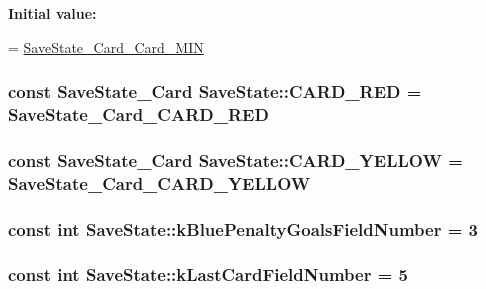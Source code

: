 {\bfseries Initial value\-:}
\begin{DoxyCode}
=
    \hyperlink{savestate_8pb_8h_a3036369938ecbd69a0b4c60da88f4022}{SaveState\_Card\_Card\_MIN}
\end{DoxyCode}
\hypertarget{class_save_state_ad5a49006bca296944d1e47866f19b563}{
\subsubsection[{C\-A\-R\-D\-\_\-\-R\-E\-D}]{\setlength{\rightskip}{0pt plus 5cm}const {\bf Save\-State\-\_\-\-Card} Save\-State\-::\-C\-A\-R\-D\-\_\-\-R\-E\-D = {\bf Save\-State\-\_\-\-Card\-\_\-\-C\-A\-R\-D\-\_\-\-R\-E\-D}\hspace{0.3cm}{\ttfamily [static]}}}\label{class_save_state_ad5a49006bca296944d1e47866f19b563}
\hypertarget{class_save_state_a84a75080b197d2db26f057a9b1bcf6fa}{
\subsubsection[{C\-A\-R\-D\-\_\-\-Y\-E\-L\-L\-O\-W}]{\setlength{\rightskip}{0pt plus 5cm}const {\bf Save\-State\-\_\-\-Card} Save\-State\-::\-C\-A\-R\-D\-\_\-\-Y\-E\-L\-L\-O\-W = {\bf Save\-State\-\_\-\-Card\-\_\-\-C\-A\-R\-D\-\_\-\-Y\-E\-L\-L\-O\-W}\hspace{0.3cm}{\ttfamily [static]}}}\label{class_save_state_a84a75080b197d2db26f057a9b1bcf6fa}
\hypertarget{class_save_state_adb90bc94a38a09d43029e70c871c3451}{
\subsubsection[{k\-Blue\-Penalty\-Goals\-Field\-Number}]{\setlength{\rightskip}{0pt plus 5cm}const int Save\-State\-::k\-Blue\-Penalty\-Goals\-Field\-Number = 3\hspace{0.3cm}{\ttfamily [static]}}}\label{class_save_state_adb90bc94a38a09d43029e70c871c3451}
\hypertarget{class_save_state_af5458dd12394b9c7319a20c709b30f9b}{
\subsubsection[{k\-Last\-Card\-Field\-Number}]{\setlength{\rightskip}{0pt plus 5cm}const int Save\-State\-::k\-Last\-Card\-Field\-Number = 5\hspace{0.3cm}{\ttfamily [static]}}}\label{class_save_state_af5458dd12394b9c7319a20c709b30f9b}
